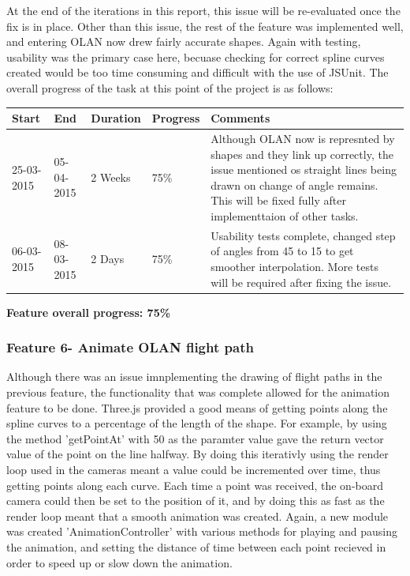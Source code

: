 At the end of the iterations in this report, this issue will be re-evaluated once the fix is in place. Other than this issue, the rest of the feature was implemented well, and entering OLAN now drew fairly accurate shapes. Again with testing, usability was the primary case here, becuase checking for correct spline curves created would be too time consuming and difficult with the use of JSUnit. The overall progress of the task at this point of the project is as follows:

\begin{table}[h]
\begin{tabular}{|l|l|l|l|p{7cm}|}
\hline
\textbf{Start} & \textbf{End} & \textbf{Duration} & \textbf{Progress} & \textbf{Comments}                                                                                                     \\ \hline
25-03-2015     & 05-04-2015   & 2 Weeks            & 75\%             &  Although OLAN now is represnted by shapes and they link up correctly, the issue mentioned os straight lines being drawn on change of angle remains. This will be fixed fully after implementtaion of other tasks.\\ \hline
06-03-2015     & 08-03-2015   & 2 Days            & 75\%             &  Usability tests complete, changed step of angles from 45 to 15 to get smoother interpolation. More tests will be required after fixing the issue.\\ \hline
\end{tabular}
\end{table}

\textbf{Feature overall progress: 75\%}

\subsubsection{Feature 6- Animate OLAN flight path}
Although there was an issue imnplementing the drawing of flight paths in the previous feature, the functionality that was complete allowed for the animation feature to be done. Three.js provided a good means of getting points along the spline curves to a percentage of the length of the shape. For example, by using the method 'getPointAt' with 50 as the paramter value gave the return vector value of the point on the line halfway. By doing this iterativly using the render loop used in the cameras meant a value could be incremented over time, thus getting points along each curve. Each time a point was received, the on-board camera could then be set to the position of it, and by doing this as fast as the render loop meant that a smooth animation was created. Again, a new module was created 'AnimationController' with various methods for playing and pausing the animation, and setting the distance of time between each point recieved in order to speed up or slow down the animation.

